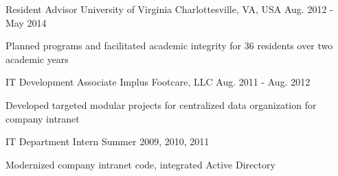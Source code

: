 \begin{cventries}
    \cventry
      {Resident Advisor}
      {University of Virginia}
      {Charlottesville, VA, USA}
      {Aug. 2012 - May 2014}
      {
        \begin{cvitems}
          \item Planned programs and facilitated academic integrity for 36 residents over two academic years
        \end{cvitems}
      }

    \cventry
      {IT Development Associate}
      {Implus Footcare, LLC}
      {}
      {Aug. 2011 - Aug. 2012}
      {
        \begin{cvitems}
          \item Developed targeted modular projects for centralized data organization for company intranet
        \end{cvitems}
      }

    \cventry
    {IT Department Intern}
    {}
    {}
    {Summer 2009, 2010, 2011}
    {
      \begin{cvitems}
        \item Modernized company intranet code, integrated Active Directory
      \end{cvitems}
    }

  \end{cventries}
